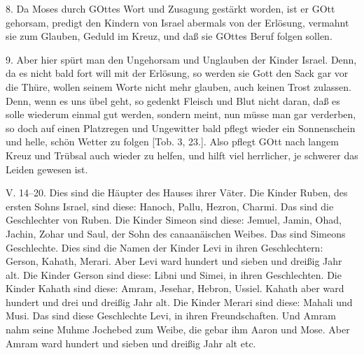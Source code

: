 8. Da Moses durch GOttes Wort und Zusagung gestärkt worden, ist er GOtt gehorsam, predigt den Kindern von Israel abermals von der Erlösung, vermahnt sie zum Glauben, Geduld im Kreuz, und daß sie GOttes Beruf folgen sollen.

9. Aber hier spürt man den Ungehorsam und Unglauben der Kinder Israel. Denn, da es nicht bald fort will mit der Erlösung, so werden sie Gott den Sack gar vor die Thüre, wollen seinem Worte nicht mehr glauben, auch keinen Trost zulassen. Denn, wenn es uns übel geht, so gedenkt Fleisch und Blut nicht daran, daß es solle wiederum einmal gut werden, sondern meint, nun müsse man gar verderben, so doch auf einen Platzregen und Ungewitter bald pflegt wieder ein Sonnenschein und helle, schön Wetter zu folgen [Tob. 3, 23.]. Also pflegt GOtt nach langem Kreuz und Trübsal auch wieder zu helfen, und hilft viel herrlicher, je schwerer das Leiden gewesen ist.

\begin{schriftzitat}
V. 14–20. Dies sind die Häupter des Hauses ihrer Väter. Die Kinder Ruben, des ersten Sohns Israel, sind diese: Hanoch, Pallu, Hezron, Charmi. Das sind die Geschlechter von Ruben. Die Kinder Simeon sind diese: Jemuel, Jamin, Ohad, Jachin, Zohar und Saul, der Sohn des canaanäischen Weibes. Das sind Simeons Geschlechte. Dies sind die Namen der Kinder Levi in ihren Geschlechtern: Gerson, Kahath, Merari. Aber Levi ward hundert und sieben und dreißig Jahr alt. Die Kinder Gerson sind diese: Libni und Simei, in ihren Geschlechten. Die Kinder Kahath sind diese: Amram, Jesehar, Hebron, Ussiel. Kahath aber ward hundert und drei und dreißig Jahr alt. Die Kinder Merari sind diese: Mahali und Musi. Das sind diese Geschlechte Levi, in ihren Freundschaften. Und Amram nahm seine Muhme Jochebed zum Weibe, die gebar ihm Aaron und Mose. Aber Amram ward hundert und sieben und dreißig Jahr alt etc.
\end{schriftzitat}

